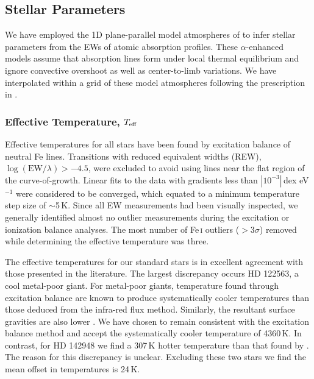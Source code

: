 \documentclass{emulateapj}
\begin{document}


\subsection{Stellar Parameters}
We have employed the 1D plane-parallel model atmospheres of \citet{castelli;kurucz_2004} to infer stellar parameters from the EWs of atomic absorption profiles. These $\alpha$-enhanced models assume that absorption lines form under local thermal equilibrium and ignore convective overshoot as well as center-to-limb variations. We have interpolated within a grid of these model atmospheres following the prescription in \citet{casey;et-al_2013b}.

\subsubsection{Effective Temperature, $T_{\rm eff}$}
Effective temperatures for all stars have been found by excitation balance of neutral Fe lines. Transitions with reduced equivalent widths (REW), $\log(\textrm{EW}/\lambda) > -4.5$, were excluded to avoid using lines near the flat region of the curve-of-growth. Linear fits to the data with gradients less than $|10^{-3}|$\,dex eV$^{-1}$ were considered to be converged, which equated to a minimum temperature step size of $\sim$5\,K. Since all EW measurements had been visually inspected, we generally identified almost no outlier measurements during the excitation or ionization balance analyses. The most number of Fe\,\textsc{i} outliers ($>3\sigma$) removed while determining the effective temperature was three.


The effective temperatures for our standard stars is in excellent agreement with those presented in the literature. The largest discrepancy occurs HD 122563, a cool metal-poor giant. For metal-poor giants, temperature found through excitation balance are known to produce systematically cooler temperatures than those deduced from the infra-red flux method. Similarly, the resultant surface gravities are also lower \citep[see][for a discussion]{frebel;et-al_2013a}. We have chosen to remain consistent with the excitation balance method and accept the systematically cooler temperature of 4360\,K. In contrast, for HD 142948 we find a 307\,K hotter temperature than that found by \citet{gratton;et-al_2000}. The reason for this discrepancy is unclear. Excluding these two stars we find the mean offset in temperatures is 24\,K.
\end{document}
